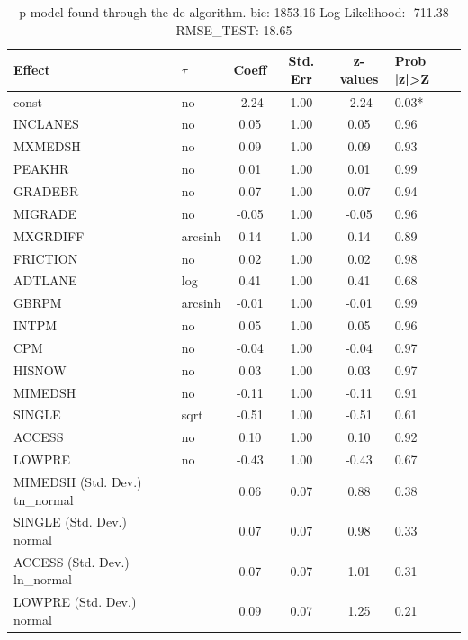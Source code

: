 \begin{table}
	\caption{p model found through the de algorithm. bic: 1853.16 Log-Likelihood: -711.38 RMSE_TEST: 18.65}
	\begin{center}
		\begin{tabular}{|l|l|c|c|c|l|}
			\hline
			Effect & $\tau$ & Coeff & Std. Err & z-values & Prob |z|>Z \\
			\hline
			const & no & -2.24 & 1.00 & -2.24 & 0.03* \\
			\hline
			INCLANES & no & 0.05 & 1.00 & 0.05 & 0.96 \\
			\hline
			MXMEDSH & no & 0.09 & 1.00 & 0.09 & 0.93 \\
			\hline
			PEAKHR & no & 0.01 & 1.00 & 0.01 & 0.99 \\
			\hline
			GRADEBR & no & 0.07 & 1.00 & 0.07 & 0.94 \\
			\hline
			MIGRADE & no & -0.05 & 1.00 & -0.05 & 0.96 \\
			\hline
			MXGRDIFF & arcsinh & 0.14 & 1.00 & 0.14 & 0.89 \\
			\hline
			FRICTION & no & 0.02 & 1.00 & 0.02 & 0.98 \\
			\hline
			ADTLANE & log & 0.41 & 1.00 & 0.41 & 0.68 \\
			\hline
			GBRPM & arcsinh & -0.01 & 1.00 & -0.01 & 0.99 \\
			\hline
			INTPM & no & 0.05 & 1.00 & 0.05 & 0.96 \\
			\hline
			CPM & no & -0.04 & 1.00 & -0.04 & 0.97 \\
			\hline
			HISNOW & no & 0.03 & 1.00 & 0.03 & 0.97 \\
			\hline
			MIMEDSH & no & -0.11 & 1.00 & -0.11 & 0.91 \\
			\hline
			SINGLE & sqrt & -0.51 & 1.00 & -0.51 & 0.61 \\
			\hline
			ACCESS & no & 0.10 & 1.00 & 0.10 & 0.92 \\
			\hline
			LOWPRE & no & -0.43 & 1.00 & -0.43 & 0.67 \\
			\hline
			MIMEDSH (Std. Dev.) tn_normal &  & 0.06 & 0.07 & 0.88 & 0.38 \\
			\hline
			SINGLE (Std. Dev.) normal &  & 0.07 & 0.07 & 0.98 & 0.33 \\
			\hline
			ACCESS (Std. Dev.) ln_normal &  & 0.07 & 0.07 & 1.01 & 0.31 \\
			\hline
			LOWPRE (Std. Dev.) normal &  & 0.09 & 0.07 & 1.25 & 0.21 \\
			\hline
		\end{tabular}
	\end{center}
\end{table}